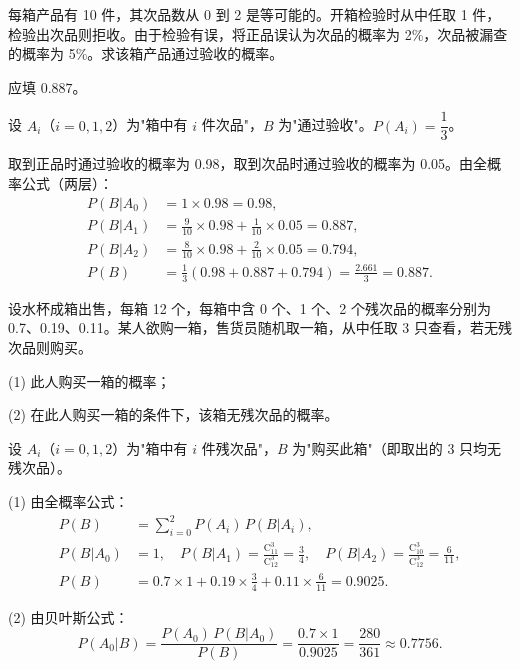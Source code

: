 ﻿\documentclass[lang=cn,11pt]{elegantbook}
\begin{document}
\begin{exercise}\label{exer:1-42}
每箱产品有 10 件，其次品数从 0 到 2 是等可能的。开箱检验时从中任取 1 件，检验出次品则拒收。由于检验有误，将正品误认为次品的概率为 2\%，次品被漏查的概率为 5\%。求该箱产品通过验收的概率。
\end{exercise}

\begin{solution}
应填 \(0.887\)。

设 \(A_i\)（\(i=0,1,2\)）为"箱中有 \(i\) 件次品"，\(B\) 为"通过验收"。\(P(A_i)=\dfrac{1}{3}\)。

取到正品时通过验收的概率为 0.98，取到次品时通过验收的概率为 0.05。由全概率公式（两层）：
\begin{align*}
P(B|A_0) &= 1\times 0.98 = 0.98, \\
P(B|A_1) &= \frac{9}{10}\times 0.98 + \frac{1}{10}\times 0.05 = 0.887, \\
P(B|A_2) &= \frac{8}{10}\times 0.98 + \frac{2}{10}\times 0.05 = 0.794, \\
P(B) &= \frac{1}{3}(0.98+0.887+0.794) = \frac{2.661}{3} = 0.887.
\end{align*}
\end{solution}

\begin{exercise}\label{exer:1-52}
设水杯成箱出售，每箱 12 个，每箱中含 0 个、1 个、2 个残次品的概率分别为 0.7、0.19、0.11。某人欲购一箱，售货员随机取一箱，从中任取 3 只查看，若无残次品则购买。\par
(1) 此人购买一箱的概率；\par
(2) 在此人购买一箱的条件下，该箱无残次品的概率。
\end{exercise}

\begin{solution}
设 \(A_i\)（\(i=0,1,2\)）为"箱中有 \(i\) 件残次品"，\(B\) 为"购买此箱"（即取出的 3 只均无残次品）。

(1) 由全概率公式：
\begin{align*}
P(B) &= \sum_{i=0}^{2}P(A_i)\,P(B|A_i), \\
P(B|A_0) &= 1, \quad P(B|A_1) = \frac{\mathrm{C}_{11}^3}{\mathrm{C}_{12}^3} = \frac{3}{4}, \quad P(B|A_2) = \frac{\mathrm{C}_{10}^3}{\mathrm{C}_{12}^3} = \frac{6}{11}, \\
P(B) &= 0.7\times 1 + 0.19\times\frac{3}{4} + 0.11\times\frac{6}{11} = 0.9025.
\end{align*}

(2) 由贝叶斯公式：
\[
P(A_0|B) = \frac{P(A_0)\,P(B|A_0)}{P(B)} = \frac{0.7\times 1}{0.9025} = \frac{280}{361} \approx 0.7756.
\]
\end{solution}
\end{document}
